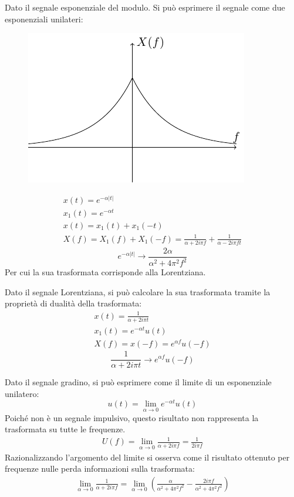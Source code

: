 \documentclass{article}
\numberwithin{equation}{subsection}
\begin{document}
Dato il segnale esponenziale del modulo. Si può esprimere il segnale come due esponenziali unilateri:
\begin{figure}[H]%
    \centering
    \includegraphics{esponenziali-unilateri.pdf}%
\end{figure}
\begin{gather*}
    x(t)=e^{-\alpha|t|}\\
    x_1(t)=e^{-\alpha t}\\
    x(t)=x_1(t)+x_1(-t)\\
    X(f)=X_1(f)+X_1(-f)=\displaystyle\frac{1}{\alpha+2i\pi f}+\frac{1}{\alpha-2i\pi ft}
\end{gather*}
\begin{equation}
    e^{-\alpha|t|}\to\frac{2\alpha}{\alpha^2+4\pi^2f^2}
\end{equation}
Per cui la sua trasformata corrisponde alla Lorentziana. 


Dato il segnale Lorentziana, si può calcolare la sua trasformata tramite la proprietà di dualità della trasformata: 
\begin{gather*}
    x(t)=\displaystyle\frac{1}{\alpha+2i\pi t}\\
    x_1(t)=e^{-\alpha t}u(t)\\
    X(f)=x(-f)=e^{\alpha f}u(-f)
\end{gather*}
\begin{equation}
    \displaystyle\frac{1}{\alpha+2i\pi t}\to e^{\alpha f}u(-f)
\end{equation}


Dato il segnale gradino, si può esprimere come il limite di un esponenziale unilatero:
\begin{equation*}
    u(t)=\lim_{\alpha\to0}e^{-\alpha t}{u(t)}
\end{equation*}
Poiché non è un segnale impulsivo, questo risultato non rappresenta la trasformata su tutte le frequenze. 
\begin{gather*}
    U(f)=\displaystyle\lim_{\alpha\to0}\frac{1}{\alpha+2i\pi f}=\frac{1}{2i\pi f}
\end{gather*}
Razionalizzando l'argomento del limite si osserva come il risultato ottenuto per frequenze nulle perda informazioni sulla trasformata:
\begin{gather*}
    \displaystyle\lim_{\alpha\to0}\frac{1}{\alpha+2i\pi f}=\lim_{\alpha\to0}\left(\frac{\alpha}{\alpha^2+4\pi^2f^2}-\frac{2i\pi f}{\alpha^2+4\pi^2f^2}\right)
\end{gather*}
\end{document}
